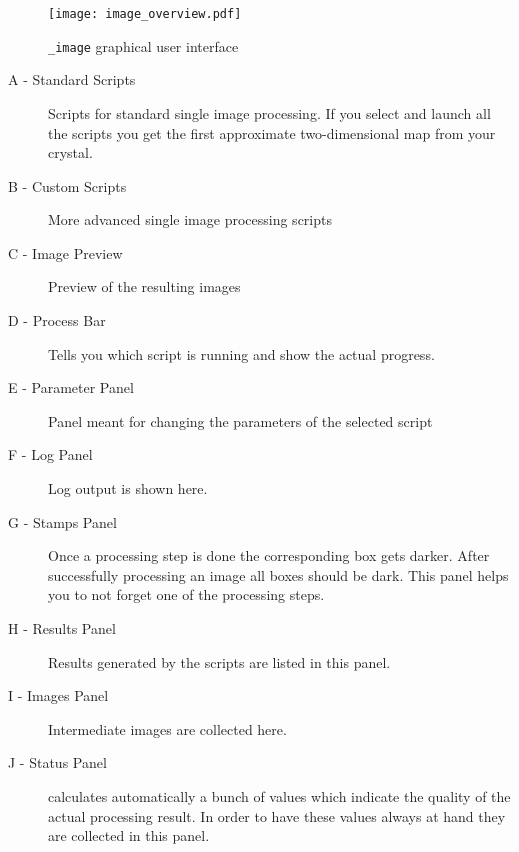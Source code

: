 \begin{figure}[H]
	\centering
	\texttt{[image: image\_overview.pdf]}
	\caption{{\twodx}\texttt{\_image} graphical user interface}
	\label{fig:gui_overview_image}
\end{figure}

\begin{description}
	\item[A - Standard Scripts] Scripts for standard single image processing. If you select and launch all the scripts you get the first approximate two-dimensional map from your crystal.
	\item[B - Custom Scripts] More advanced single image processing scripts
	\item[C - Image Preview] Preview of the resulting images
	\item[D - Process Bar] Tells you which script is running and show the actual progress.
	\item[E - Parameter Panel] Panel meant for changing the parameters of the selected script
	\item[F - Log Panel] Log output is shown here.
	\item[G - Stamps Panel] Once a processing step is done the corresponding box gets darker. After successfully processing an image all boxes should be dark. This panel helps you to not forget one of the processing steps.
	\item[H - Results Panel] Results generated by the scripts are listed in this panel.
	\item[I - Images Panel] Intermediate images are collected here.
	\item[J - Status Panel] {\twodx} calculates automatically a bunch of values which indicate the quality of the actual processing result. In order to have these values always at hand they are collected in this panel.
\end{description}


